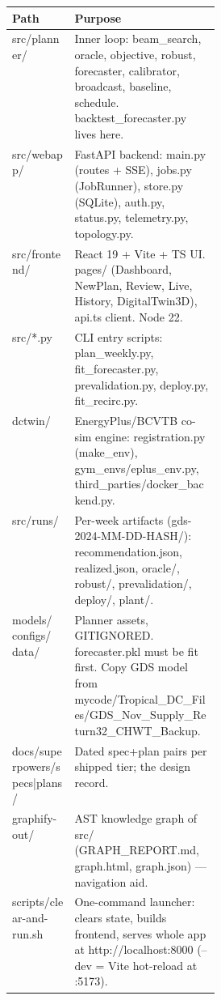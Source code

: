\documentclass[10pt]{article}
\begin{document}
\vspace{1pt}\begin{tabularx}{\linewidth}{@{}>{\ttfamily\small}p{0.30\linewidth} X@{}}
\toprule
\textbf{Path} & \textbf{Purpose} \\
\midrule
src/\allowbreak{}planner/\allowbreak{} & Inner loop: beam\_\allowbreak{}search, oracle, objective, robust, forecaster, calibrator, broadcast, baseline, schedule. backtest\_\allowbreak{}forecaster.py lives here. \\
src/\allowbreak{}webapp/\allowbreak{} & FastAPI backend: main.py (routes + SSE), jobs.py (JobRunner), store.py (SQLite), auth.py, status.py, telemetry.py, topology.py. \\
src/\allowbreak{}frontend/\allowbreak{} & React 19 + Vite + TS UI. pages/\allowbreak{} (Dashboard, NewPlan, Review, Live, History, DigitalTwin3D), api.ts client. Node 22. \\
src/\allowbreak{}*.py & CLI entry scripts: plan\_\allowbreak{}weekly.py, fit\_\allowbreak{}forecaster.py, prevalidation.py, deploy.py, fit\_\allowbreak{}recirc.py. \\
dctwin/\allowbreak{} & EnergyPlus/\allowbreak{}BCVTB co-sim engine: registration.py (make\_\allowbreak{}env), gym\_\allowbreak{}envs/\allowbreak{}eplus\_\allowbreak{}env.py, third\_\allowbreak{}parties/\allowbreak{}docker\_\allowbreak{}backend.py. \\
src/\allowbreak{}runs/\allowbreak{} & Per-week artifacts (gds-2024-MM-DD-HASH/\allowbreak{}): recommendation.json, realized.json, oracle/\allowbreak{}, robust/\allowbreak{}, prevalidation/\allowbreak{}, deploy/\allowbreak{}, plant/\allowbreak{}. \\
models/\allowbreak{} configs/\allowbreak{} data/\allowbreak{} & Planner assets, GITIGNORED. forecaster.pkl must be fit first. Copy GDS model from mycode/\allowbreak{}Tropical\_\allowbreak{}DC\_\allowbreak{}Files/\allowbreak{}GDS\_\allowbreak{}Nov\_\allowbreak{}Supply\_\allowbreak{}Return32\_\allowbreak{}CHWT\_\allowbreak{}Backup. \\
docs/\allowbreak{}superpowers/\allowbreak{}specs|plans/\allowbreak{} & Dated spec+plan pairs per shipped tier; the design record. \\
graphify-out/\allowbreak{} & AST knowledge graph of src/\allowbreak{} (GRAPH\_\allowbreak{}REPORT.md, graph.html, graph.json) — navigation aid. \\
scripts/\allowbreak{}clear-and-run.sh & One-command launcher: clears state, builds frontend, serves whole app at http:/\allowbreak{}/\allowbreak{}localhost:8000 (--dev = Vite hot-reload at :5173). \\
\bottomrule
\end{tabularx}\vspace{2pt}
\end{document}
